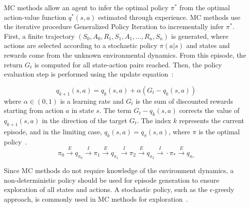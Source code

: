 \documentclass[../xlapes02]{subfiles}
\begin{document}
    MC methods allow an agent to infer the optimal policy $\pi^*$ from the optimal action-value function $q^*(s,a)$ estimated through experience. MC methods use the iterative procedure Generalized Policy Iteration to incrementally infer $\pi^*$. First, a finite trajectory $(S_0, A_0, R_1, S_1, A_1, ..., R_n, S_n)$ is generated, where actions are selected according to a stochastic policy $\pi(a|s)$ and states and rewards come from the unknown environmental dynamics. From this episode, the return $G_t$ is computed for all state-action pairs reached. Then, the policy evaluation step is performed using the update equation~\cite{sutton2018reinforcement, FITMT25127, rao2022foundations}:


    \begin{equation}
        \label{eq:mc}
        q_{k+1}(s, a) = q_k(s, a) + \alpha(G_t - q_k(s, a))
    \end{equation}
    where $\alpha \in (0,1)$ is a learning rate and $G_t$ is the sum of discounted rewards starting from action $a$ in state $s$. The term $G_t - q_k(s, a)$ corrects the value of $q_{k+1}(s,a)$ in the direction of the target $G_t$. The index $k$ represents the current episode, and in the limiting case, $q_k(s,a) = q_{\pi}(s,a)$, where $\pi$ is the optimal policy~\cite{sutton2018reinforcement}.
    \begin{equation}
        \pi_0 \xrightarrow{E} q_{\pi_0} \xrightarrow{I}
        \pi_1 \xrightarrow{E} q_{\pi_1} \xrightarrow{I}
        \pi_2 \xrightarrow{E} q_{\pi_2} \xrightarrow{I}
        \cdot
        \pi_* \xrightarrow{E} q_{\pi_*}
    \end{equation}

    Since MC methods do not require knowledge of the environment dynamics, a non-deterministic policy should be used for episode generation to ensure exploration of all states and actions. A stochastic policy, such as the $\epsilon$-greedy approach, is commonly used in MC methods for exploration~\cite{FITMT25127}.
\end{document}
